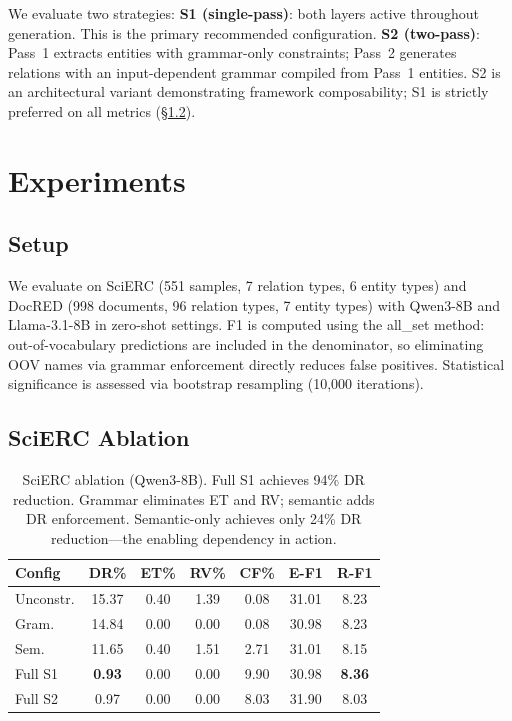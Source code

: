 \documentclass[11pt,a4paper]{article}
\begin{document}
We evaluate two strategies:
\textbf{S1 (single-pass)}: both layers active throughout generation. This is the primary recommended configuration.
\textbf{S2 (two-pass)}: Pass~1 extracts entities with grammar-only constraints; Pass~2 generates relations with an input-dependent grammar compiled from Pass~1 entities.
S2 is an architectural variant demonstrating framework composability; S1 is strictly preferred on all metrics (\S\ref{sec:ablation}).

\section{Experiments}
\label{sec:experiments}

\subsection{Setup}

We evaluate on SciERC \cite{Luan2018SciERC} (551 samples, 7 relation types, 6 entity types) and DocRED \cite{Yao2019DocRED} (998 documents, 96 relation types, 7 entity types) with Qwen3-8B and Llama-3.1-8B in zero-shot settings.
F1 is computed using the all\_set method: out-of-vocabulary predictions are included in the denominator, so eliminating OOV names via grammar enforcement directly reduces false positives.
Statistical significance is assessed via bootstrap resampling (10,000 iterations).

\subsection{SciERC Ablation}
\label{sec:ablation}

\begin{table}[t]
\centering
\small
\begin{tabular}{lcccccc}
\toprule
\textbf{Config} & \textbf{DR\%} & \textbf{ET\%} & \textbf{RV\%} & \textbf{CF\%} & \textbf{E-F1} & \textbf{R-F1} \\
\midrule
Unconstr. & 15.37 & 0.40 & 1.39 & 0.08 & 31.01 & 8.23 \\
Gram. & 14.84 & 0.00 & 0.00 & 0.08 & 30.98 & 8.23 \\
Sem. & 11.65 & 0.40 & 1.51 & 2.71 & 31.01 & 8.15 \\
Full S1 & \textbf{0.93} & 0.00 & 0.00 & 9.90 & 30.98 & \textbf{8.36} \\
Full S2 & 0.97 & 0.00 & 0.00 & 8.03 & 31.90 & 8.03 \\
\bottomrule
\end{tabular}
\caption{SciERC ablation (Qwen3-8B). Full S1 achieves 94\% DR reduction. Grammar eliminates ET and RV; semantic adds DR enforcement. Semantic-only achieves only 24\% DR reduction---the enabling dependency in action.}
\label{tab:scierc-ablation}
\end{table}
\end{document}
